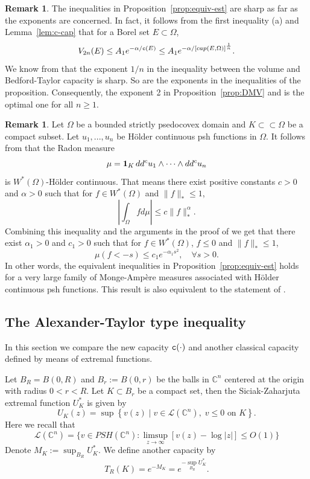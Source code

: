 \documentclass{amsart}
\newcommand{\al}{\alpha}
\newcommand{\tc}{{\tt c}}
\newcommand{\Om}{\Omega}
\newcommand{\bC}{\mathbb{C}}
\newcommand{\cali}[1]{\mathscr{#1}}
\newcommand{\Lc}{\cali{L}}
\theoremstyle{definition}
\newtheorem{remark}[thm]{Remark}
\numberwithin{thm}{section}
\numberwithin{equation}{section}
\renewcommand{\[}{\begin{equation}}
\renewcommand{\]}{\end{equation}}
\newcommand{\rv}{\;\rvert\;}
\newcommand{\wed}{\wedge}
\begin{document}
\begin{remark}\label{rmk:sharp-DMV} The inequalities in Proposition~\ref{prop:equiv-est} are sharp as far as the exponents are concerned. In fact, it follows from the first inequality (a) and Lemma~\ref{lem:c-cap} that for a Borel set $E\subset \Om$, 
$$
	V_{2n} (E) \leq A_1 e^{-\al/ \tc (E)} \leq A_1 e^{-\al/ [cap(E, \Om)]^\frac{1}{n}}.
$$
We know from \cite[Theorem~A]{ACKPZ09} that the exponent $1/n$ in the inequality between the  volume and Bedford-Taylor capacity is sharp. So are the exponents in the inequalities of the proposition. Consequently, the exponent 2 in Proposition~\ref{prop:DMV} and \cite[Theorem~1.2]{DMV} is the optimal one for all $n\geq 1$.
\end{remark}

\begin{remark}\label{rmk:DMV-holder} Let $\Om$ be a bounded strictly psedocovex domain and $K\subset \subset \Om$ be a compact subset. Let $u_1,...,u_n$ be H\"older continuous psh functions in $\Om$. It follows from \cite[Proposition~2.4]{DKN} that the Radon measure 
$$\mu = {\bf 1}_K \, dd^c u_1 \wed \cdots \wed dd^c u_n$$
is $W^*(\Om)$-H\"older continuous. That means there exist positive constants $c>0$ and $\al>0$  such that for $f\in W^*(\Om)$ and $\|f\|_* \leq 1$,
$$
	\left| \int_\Om f d\mu \right| \leq  c \|f\|_{*}^\al.
$$
Combining this inequality and the arguments in the proof of \cite[Proposition~2.9]{Ng18} we get that there exist $\al_1>0$ and $c_1>0$ such that   for $f \in W^*(\Om)$, $f\leq 0$ and $\|f\|_* \leq 1$, 
$$
	\mu (f < -s) \leq c_1 e^{-\al_1 s^2},  \quad  \forall s>0.
$$
In other words, the equivalent inequalities in Proposition~\ref{prop:equiv-est} holds for a very large family of Monge-Amp\`ere measures associated with  H\"older continuous psh functions. This result is also equivalent to the statement of \cite[Theorem~1.2]{DMV}.
\end{remark}



\subsection{The Alexander-Taylor type inequality}
\label{ss:AT}
 In this section  we compare the new capacity $\tc (\cdot)$ and another classical capacity defined by means of extremal functions. 

Let $B_R = B(0,R)$ and $B_r:=B(0,r)$ be the balls in $\bC^n$ centered at the origin with radius $0<r< R$.  Let $K\subset B_r$ be a compact set, then  the Siciak-Zaharjuta extremal function $U_K^*$ is given by
$$	U_K (z) = \sup\left\{v(z) \rv v\in \Lc(\bC^n), \; v\leq 0 \text{ on } K\right \}.
$$ 
Here we recall that 
\[\label{eq:L-class}
	\Lc(\bC^n) = \{ v\in PSH(\bC^n): \limsup_{z\to \infty} [v(z) -\log|z|] \leq O(1)\}
\]
Denote $M_K := \sup_{B_R} U_K^*$. We define another capacity by
\[\label{eq:AT-cap}
	T_R(K) = e^{- M_K} = e^{-\sup_{B_R} U_K^*}.
\]
\end{document}
